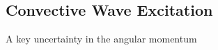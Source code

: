 {\color{purple}
\subsection{Convective Wave Excitation}
}

A key uncertainty in the angular momentum 
